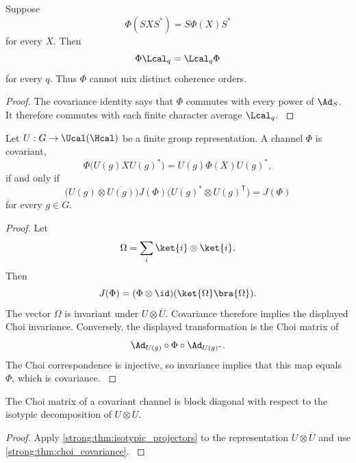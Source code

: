 \begin{theorem}\label{strong:theorem:023}\label{strong:thm:covariant_channel}
Suppose
\[
\Phi(SXS^*)=S\Phi(X)S^*
\]
for every \(X\). Then
\[
\Phi\Lcal_q=\Lcal_q\Phi
\]
for every \(q\). Thus \(\Phi\) cannot mix distinct coherence orders.
\end{theorem}

\begin{proof}\label{strong:proof:034}
The covariance identity says that \(\Phi\) commutes with every power of \(\Ad_S\). It therefore commutes with each finite character average \(\Lcal_q\).
\label{strong:proof:034:end}\end{proof}

\begin{theorem}\label{strong:theorem:024}\label{strong:thm:choi_covariance}
Let \(U:G\to\Ucal(\Hcal)\) be a finite group representation. A channel \(\Phi\) is covariant,
\[
\Phi\bigl(U(g)XU(g)^*\bigr)
=
U(g)\Phi(X)U(g)^*,
\]
if and only if
\[
\bigl(U(g)\otimes\overline{U(g)}\bigr)
J(\Phi)
\bigl(U(g)^*\otimes U(g)^{\mathsf T}\bigr)
=
J(\Phi)
\]
for every \(g\in G\).
\end{theorem}

\begin{proof}\label{strong:proof:035}
Let
\[
\Omega=\sum_i\ket{i}\otimes\ket{i}.
\]
Then
\[
J(\Phi)=(\Phi\otimes\id)(\ket{\Omega}\bra{\Omega}).
\]
The vector \(\Omega\) is invariant under \(U\otimes\overline U\). Covariance therefore implies the displayed Choi invariance. Conversely, the displayed transformation is the Choi matrix of
\[
\Ad_{U(g)}\circ\Phi\circ\Ad_{U(g)^*}.
\]
The Choi correspondence is injective, so invariance implies that this map equals \(\Phi\), which is covariance.
\label{strong:proof:035:end}\end{proof}

\begin{corollary}\label{strong:corollary:009}\label{strong:cor:choi_packets}
The Choi matrix of a covariant channel is block diagonal with respect to the isotypic decomposition of \(U\otimes\overline U\).
\end{corollary}

\begin{proof}\label{strong:proof:036}
Apply \cref{strong:thm:isotypic_projectors} to the representation \(U\otimes\overline U\) and use \cref{strong:thm:choi_covariance}.
\label{strong:proof:036:end}\end{proof}

